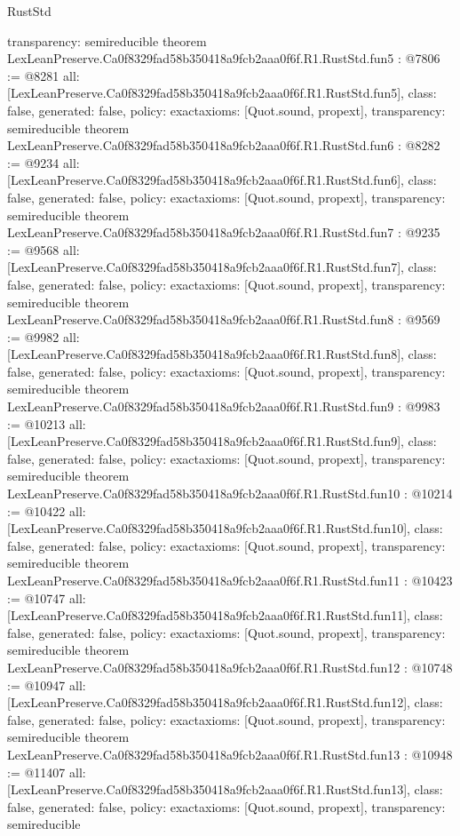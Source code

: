 \begin{lexlean}{RustStd}
\begin{coremodule}
{  transparency: semireducible
}
theorem LexLeanPreserve.Ca0f8329fad58b350418a9fcb2aaa0f6f.R1.RustStd.fun5 : @7806 := @8281 {
  all: [LexLeanPreserve.Ca0f8329fad58b350418a9fcb2aaa0f6f.R1.RustStd.fun5],
  class: false,
  generated: false,
  policy: exact{axioms: [Quot.sound, propext]},
  transparency: semireducible
}
theorem LexLeanPreserve.Ca0f8329fad58b350418a9fcb2aaa0f6f.R1.RustStd.fun6 : @8282 := @9234 {
  all: [LexLeanPreserve.Ca0f8329fad58b350418a9fcb2aaa0f6f.R1.RustStd.fun6],
  class: false,
  generated: false,
  policy: exact{axioms: [Quot.sound, propext]},
  transparency: semireducible
}
theorem LexLeanPreserve.Ca0f8329fad58b350418a9fcb2aaa0f6f.R1.RustStd.fun7 : @9235 := @9568 {
  all: [LexLeanPreserve.Ca0f8329fad58b350418a9fcb2aaa0f6f.R1.RustStd.fun7],
  class: false,
  generated: false,
  policy: exact{axioms: [Quot.sound, propext]},
  transparency: semireducible
}
theorem LexLeanPreserve.Ca0f8329fad58b350418a9fcb2aaa0f6f.R1.RustStd.fun8 : @9569 := @9982 {
  all: [LexLeanPreserve.Ca0f8329fad58b350418a9fcb2aaa0f6f.R1.RustStd.fun8],
  class: false,
  generated: false,
  policy: exact{axioms: [Quot.sound, propext]},
  transparency: semireducible
}
theorem LexLeanPreserve.Ca0f8329fad58b350418a9fcb2aaa0f6f.R1.RustStd.fun9 : @9983 := @10213 {
  all: [LexLeanPreserve.Ca0f8329fad58b350418a9fcb2aaa0f6f.R1.RustStd.fun9],
  class: false,
  generated: false,
  policy: exact{axioms: [Quot.sound, propext]},
  transparency: semireducible
}
theorem LexLeanPreserve.Ca0f8329fad58b350418a9fcb2aaa0f6f.R1.RustStd.fun10 : @10214 := @10422 {
  all: [LexLeanPreserve.Ca0f8329fad58b350418a9fcb2aaa0f6f.R1.RustStd.fun10],
  class: false,
  generated: false,
  policy: exact{axioms: [Quot.sound, propext]},
  transparency: semireducible
}
theorem LexLeanPreserve.Ca0f8329fad58b350418a9fcb2aaa0f6f.R1.RustStd.fun11 : @10423 := @10747 {
  all: [LexLeanPreserve.Ca0f8329fad58b350418a9fcb2aaa0f6f.R1.RustStd.fun11],
  class: false,
  generated: false,
  policy: exact{axioms: [Quot.sound, propext]},
  transparency: semireducible
}
theorem LexLeanPreserve.Ca0f8329fad58b350418a9fcb2aaa0f6f.R1.RustStd.fun12 : @10748 := @10947 {
  all: [LexLeanPreserve.Ca0f8329fad58b350418a9fcb2aaa0f6f.R1.RustStd.fun12],
  class: false,
  generated: false,
  policy: exact{axioms: [Quot.sound, propext]},
  transparency: semireducible
}
theorem LexLeanPreserve.Ca0f8329fad58b350418a9fcb2aaa0f6f.R1.RustStd.fun13 : @10948 := @11407 {
  all: [LexLeanPreserve.Ca0f8329fad58b350418a9fcb2aaa0f6f.R1.RustStd.fun13],
  class: false,
  generated: false,
  policy: exact{axioms: [Quot.sound, propext]},
  transparency: semireducible
}
\end{coremodule}
\end{lexlean}
